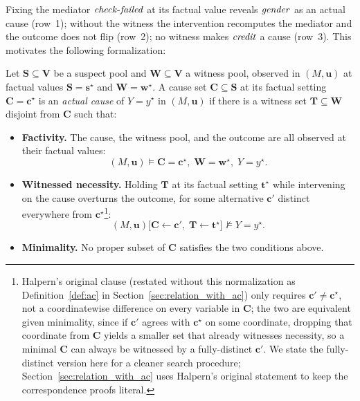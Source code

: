 \noindent Fixing the mediator $\varname{check\text{-}failed}$ at its factual value reveals
$\varname{gender}$ as an actual cause (row~1); without the witness the intervention recomputes the
mediator and the outcome does not flip (row~2); no witness makes $\varname{credit}$ a cause (row~3).
This motivates the following formalization:
\begin{definition}\label{def:ac_intuitive}
Let $\mathbf{S}\subseteq\mathbf{V}$ be a suspect pool and
$\mathbf{W}\subseteq\mathbf{V}$ a witness pool, observed in $(M,\mathbf{u})$ at
factual values $\mathbf{S}=\mathbf{s}^\star$ and $\mathbf{W}=\mathbf{w}^\star$.
A cause set $\mathbf{C}\subseteq\mathbf{S}$ at its factual setting
$\mathbf{C}=\mathbf{c}^\star$ is an \emph{actual cause} of $Y=y^\star$ in
$(M,\mathbf{u})$ if there is a witness set $\mathbf{T}\subseteq\mathbf{W}$
disjoint from $\mathbf{C}$ such that:
\begin{itemize}[itemsep=2pt,topsep=2pt,parsep=0pt]
    \item \textbf{Factivity.} The cause, the witness pool, and the outcome
    are all observed at their factual values:
    \[ (M,\mathbf{u})\vDash \mathbf{C}=\mathbf{c}^\star,\;
                              \mathbf{W}=\mathbf{w}^\star,\;
                              Y=y^\star. \]
    \item \textbf{Witnessed necessity.} Holding $\mathbf{T}$ at its factual
    setting $\mathbf{t}^\star$ while intervening on the cause overturns the
    outcome, for some alternative $\mathbf{c}'$ distinct everywhere from
    $\mathbf{c}^\star$\footnote{Halpern's original clause (restated without
    this normalization as Definition~\ref{def:ac} in
    Section~\ref{sec:relation_with_ac}) only requires $\mathbf{c}'\neq\mathbf{c}^\star$,
    not a coordinatewise difference on every variable in $\mathbf{C}$; the two
    are equivalent given minimality, since if $\mathbf{c}'$ agrees with
    $\mathbf{c}^\star$ on some coordinate, dropping that coordinate from
    $\mathbf{C}$ yields a smaller set that already witnesses necessity, so a
    minimal $\mathbf{C}$ can always be witnessed by a fully-distinct
    $\mathbf{c}'$. We state the fully-distinct version here for a cleaner
    search procedure; Section~\ref{sec:relation_with_ac} uses Halpern's
    original statement to keep the correspondence proofs literal.}:
    \[ (M,\mathbf{u})\bigl[\mathbf{C}\leftarrow\mathbf{c}',\;
                            \mathbf{T}\leftarrow\mathbf{t}^\star\bigr]
        \not\vDash Y=y^\star. \]
    \item \textbf{Minimality.} No proper subset of $\mathbf{C}$ satisfies the
    two conditions above.
\end{itemize}
\end{definition}

